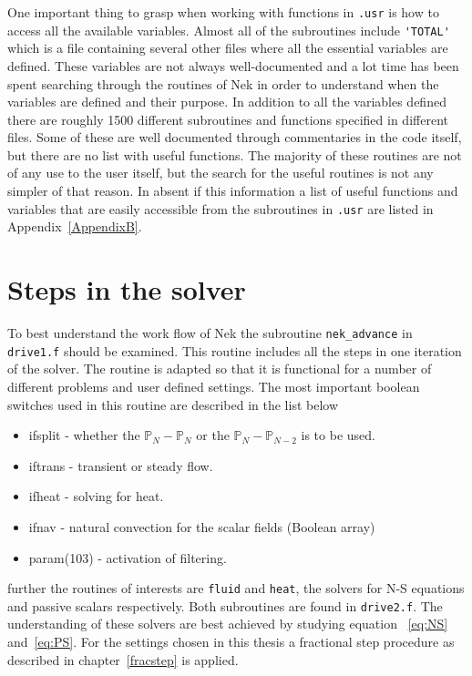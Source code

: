 One important thing to grasp when working with functions in \verb|.usr| is how to access all the 
available variables. 
Almost all of the subroutines include \verb|'TOTAL'| which is a file containing several other files
where all the essential variables are defined. 
These variables are not always well-documented and a lot time has been spent 
searching through the routines of Nek in order to understand when the variables are defined and their purpose. 
In addition to all the variables defined there are roughly 1500 different subroutines and functions specified in 
different files. Some of these are well documented through commentaries in the code itself, but there are no 
list with useful functions. The majority of these routines are not of any use to the user itself, but the search for the useful 
routines is not any simpler of that reason. In absent if this information a list of useful functions and variables that are easily 
accessible from the subroutines in \verb|.usr| are listed in Appendix~\ref{AppendixB}.
\section{Steps in the solver}
To best understand the work flow of Nek the subroutine \verb|nek_advance| in \verb|drive1.f| should be examined.
This routine includes all the steps in one iteration of the solver. The routine is adapted so that it is functional
for a number of different problems and user defined settings. The most important boolean switches used in this routine are 
described in the list below 
%
\begin{itemize}
    \item ifsplit - whether the $\mathbb{P}_N-\mathbb{P}_N$ or the $\mathbb{P}_N-\mathbb{P}_{N-2}$ is to be used.
    \item iftrans - transient or steady flow.
    \item ifheat - solving for heat.
    \item ifnav - natural convection for the scalar fields (Boolean array)
    \item param(103) - activation of filtering.
\end{itemize}
%
further the routines of interests are \verb|fluid| and \verb|heat|, the solvers for N-S equations and passive scalars respectively.
Both subroutines are found in \verb|drive2.f|. The understanding of these solvers are best achieved by studying equation ~\ref{eq:NS} 
and~\ref{eq:PS}. For the settings chosen in this thesis a fractional step procedure as described in 
chapter~\ref{fracstep} is applied.

